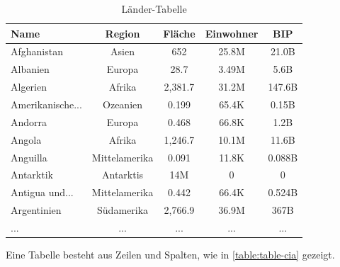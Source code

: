 \begin{table}[H]
  \centering
  \begin{tabular}{lcccc}
    \toprule
    \textbf{Name} & \textbf{Region} & \textbf{Fläche} & \textbf{Einwohner} & \textbf{BIP} \\
    \midrule
    Afghanistan & Asien & 652 & 25.8M & 21.0B \\
    Albanien & Europa & 28.7 & 3.49M & 5.6B \\
    Algerien & Afrika & 2,381.7 & 31.2M & 147.6B \\
    Amerikanische... & Ozeanien & 0.199 & 65.4K & 0.15B \\
    Andorra & Europa & 0.468 & 66.8K & 1.2B \\
    Angola & Afrika & 1,246.7 & 10.1M & 11.6B \\
    Anguilla & Mittelamerika & 0.091 & 11.8K & 0.088B \\
    Antarktik & Antarktis & 14M & 0 & 0 \\
    Antigua und... & Mittelamerika & 0.442 & 66.4K & 0.524B \\
    Argentinien & Südamerika & 2,766.9 & 36.9M & 367B \\
    \midrule
    ... & ... & ... & ... & ... \\
    \bottomrule
  \end{tabular}
  \caption{Länder-Tabelle}
  \label{table:cia-values}
\end{table}

Eine Tabelle besteht aus Zeilen und Spalten, wie in \cref{table:table-cia} gezeigt.


